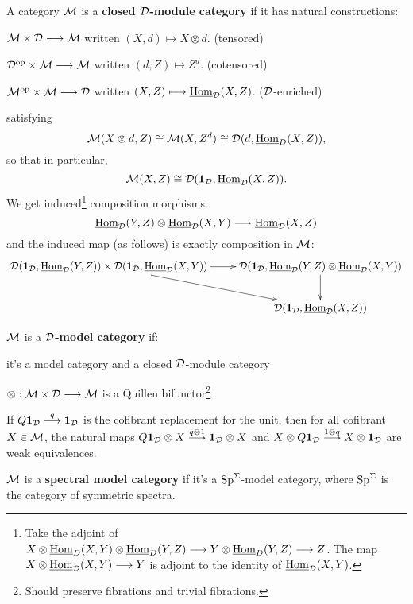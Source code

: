 \begin{MichaelStableModelCats}
\begin{itemise}
\begin{itemise}
\end{itemise}
\item A category $\mathcal{M}$ is a \textbf{closed $\mathcal{D}$-module category} if it has natural constructions:
\begin{itemise}
\item $\mathcal{M}\times \mathcal{D}\longrightarrow\mathcal{M}$ written $(X,d)\mapsto X\otimes d$. {(tensored)}
\item $\mathcal{D}^{\textup{op}}\times\mathcal{M}\longrightarrow\mathcal{M}$ written $(d,Z)\mapsto Z^d$. {(cotensored)}
\item $\mathcal{M}^{\textup{op}}\times\mathcal{M}\longrightarrow\mathcal{D}$ written $(X,Z)\longmapsto \operatorname{\underline{Hom}}_{\mathcal{D}}(X,Z)$. {($\mathcal{D}$-enriched)}
\end{itemise}
satisfying
\[\mathcal{M}(X\otimes d,Z)\cong \mathcal{M}(X,Z^d)\cong\mathcal{D}(d,\operatorname{\underline{Hom}}_D(X,Z)),\]
so that in particular,
\[\mathcal{M}(X,Z)\cong \mathcal{D}(\textbf{1}_{\mathcal{D}},\operatorname{\underline{Hom}}_{\mathcal{D}}(X,Z)).\]
We get induced\footnote{Take the adjoint of 
$X\otimes \operatorname{\underline{Hom}}_D(X,Y)\otimes\operatorname{\underline{Hom}}_D(Y,Z)\longrightarrow Y\otimes\operatorname{\underline{Hom}}_D(Y,Z)\longrightarrow Z$. The map $X\otimes \operatorname{\underline{Hom}}_{\mathcal{D}}(X,Y)\longrightarrow Y$ is adjoint to the identity of $\operatorname{\underline{Hom}}_{\mathcal{D}}(X,Y)$.} composition morphisms
\[\operatorname{\underline{Hom}}_{\mathcal{D}}(Y,Z)\otimes\operatorname{\underline{Hom}}_{\mathcal{D}}(X,Y)\longrightarrow
\operatorname{\underline{Hom}}_{\mathcal{D}}(X,Z)\]
and the induced map (as follows) is exactly composition in $\mathcal{M}$:
\[\xymatrix{
\calD(\textbf{1}_\calD,\intHom_\calD(Y,Z))\times\calD(\textbf{1}_\calD,\intHom_\calD(X,Y))\ar[r]\ar[rd]&\ar[d]\calD(\textbf{1}_\calD,\intHom_\calD(Y,Z)\otimes\intHom_\calD(X,Y))\\&\calD(\textbf{1}_\calD,\intHom_\calD(X,Z))
}\]
\item $\mathcal{M}$ is a \textbf{$\mathcal{D}$-model category} if:
\begin{itemise}
\item it's a model category and a closed $\mathcal{D}$-module category
\item $\otimes:\mathcal{M}\times\mathcal{D}\longrightarrow\mathcal{M}$ is a Quillen bifunctor\footnote{Should preserve fibrations and trivial fibrations.}
\item If $Q\textbf{1}_{\mathcal{D}}\overset{q}{\longrightarrow}\textbf{1}_{\mathcal{D}}$ is the cofibrant replacement for the unit, then for all cofibrant $X\in\mathcal{M}$, the natural maps $Q\textbf{1}_{\mathcal{D}}\otimes X\overset{q\otimes1}{\longrightarrow}\textbf{1}_{\mathcal{D}}\otimes X$ and $X\otimes Q\textbf{1}_{\mathcal{D}} \overset{1\otimes q}{\longrightarrow}X\otimes \textbf{1}_{\mathcal{D}}$ are weak equivalences.
\end{itemise}
\item $\mathcal{M}$ is a \textbf{spectral model category} if it's a $\operatorname{Sp}^\Sigma$-model category, where $\operatorname{Sp}^\Sigma$ is the category of symmetric spectra.
\end{itemise}

\end{MichaelStableModelCats}
